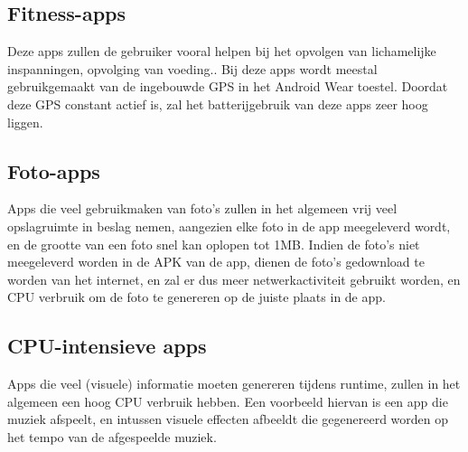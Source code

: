 \subsection{Fitness-apps}
Deze apps zullen de gebruiker vooral helpen bij het opvolgen van lichamelijke inspanningen, opvolging van voeding.. Bij deze apps wordt meestal gebruikgemaakt van de ingebouwde GPS in het Android Wear toestel. Doordat deze GPS constant actief is, zal het batterijgebruik van deze apps zeer hoog liggen.
\subsection{Foto-apps}
Apps die veel gebruikmaken van foto's zullen in het algemeen vrij veel opslagruimte in beslag nemen, aangezien elke foto in de app meegeleverd wordt, en de grootte van een foto snel kan oplopen tot 1MB. Indien de foto's niet meegeleverd worden in de APK van de app, dienen de foto's gedownload te worden van het internet, en zal er dus meer netwerkactiviteit gebruikt worden, en CPU verbruik om de foto te genereren op de juiste plaats in de app.
\subsection{CPU-intensieve apps}
Apps die veel (visuele) informatie moeten genereren tijdens runtime, zullen in het algemeen een hoog CPU verbruik hebben. Een voorbeeld hiervan is een app die muziek afspeelt, en intussen visuele effecten afbeeldt die gegenereerd worden op het tempo van de afgespeelde muziek.  
